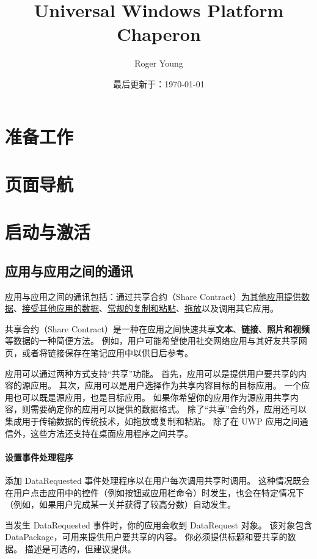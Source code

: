 \documentclass{book}
\title{Universal Windows Platform Chaperon}
\author{Roger Young}
\date{最后更新于：\today}
\newcommand{\sharecontract}{共享合约（Share Contract）}
\begin{document}
	\maketitle
	\tableofcontents
	
	\chapter{准备工作}
	
	\chapter{页面导航}
	
	\chapter{启动与激活}
	\section{应用与应用之间的通讯}
	应用与应用之间的通讯包括：通过\sharecontract \hyperref[subsection:sharedata]{为其他应用提供数据}、\hyperref[subsection:receivedata]{接受其他应用的数据}、\hyperref[subsection:copyandpaste]{常规的复制和粘贴}、\hyperref[subsection:draganddrop]{拖放}以及调用其它应用。
	
	 \sharecontract 是一种在应用之间快速共享\textbf{文本}、\textbf{链接}、\textbf{照片和视频}等数据的一种简便方法。 例如，用户可能希望使用社交网络应用与其好友共享网页，或者将链接保存在笔记应用中以供日后参考。
	 
	 应用可以通过两种方式支持“共享”功能。 首先，应用可以是提供用户要共享的内容的源应用。 其次，应用可以是用户选择作为共享内容目标的目标应用。 一个应用也可以既是源应用，也是目标应用。 如果你希望你的应用作为源应用共享内容，则需要确定你的应用可以提供的数据格式。
	 除了“共享”合约外，应用还可以集成用于传输数据的传统技术，如拖放或复制和粘贴。 除了在 UWP 应用之间通信外，这些方法还支持在桌面应用程序之间共享。
	 
	 \subsubsection{设置事件处理程序}
	 添加 DataRequested 事件处理程序以在用户每次调用共享时调用。 这种情况既会在用户点击应用中的控件（例如按钮或应用栏命令）时发生，也会在特定情况下（例如，如果用户完成某一关并获得了较高分数）自动发生。
	 
	 当发生 DataRequested 事件时，你的应用会收到 DataRequest 对象。 该对象包含 DataPackage，可用来提供用户要共享的内容。 你必须提供标题和要共享的数据。 描述是可选的，但建议提供。
	 
\end{document}
